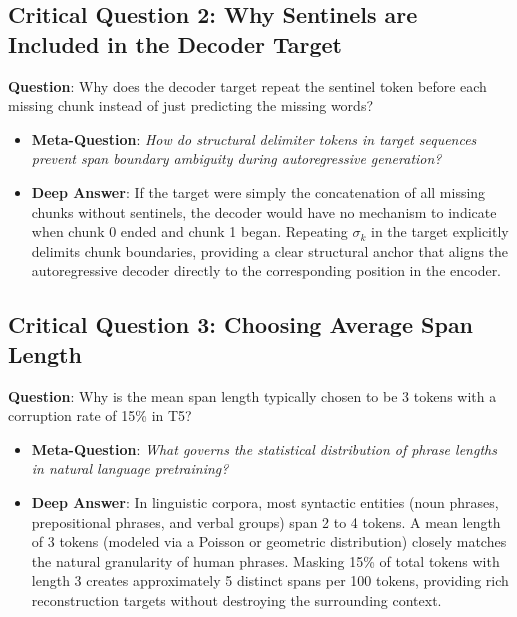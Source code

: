 \documentclass[11pt,a4paper]{article}
\theoremstyle{definition}
\begin{document}
\subsection{\textbf{Critical Question 2: Why Sentinels are Included in the Decoder Target}}
\textbf{Question}: Why does the decoder target repeat the sentinel token before each missing chunk instead of just predicting the missing words?
\begin{itemize}
    \item \textbf{Meta-Question}: \emph{How do structural delimiter tokens in target sequences prevent span boundary ambiguity during autoregressive generation?}
    \item \textbf{Deep Answer}: If the target were simply the concatenation of all missing chunks without sentinels, the decoder would have no mechanism to indicate when chunk 0 ended and chunk 1 began. Repeating $\sigma_k$ in the target explicitly delimits chunk boundaries, providing a clear structural anchor that aligns the autoregressive decoder directly to the corresponding position in the encoder.
\end{itemize}

\subsection{\textbf{Critical Question 3: Choosing Average Span Length}}
\textbf{Question}: Why is the mean span length typically chosen to be 3 tokens with a corruption rate of 15\% in T5?
\begin{itemize}
    \item \textbf{Meta-Question}: \emph{What governs the statistical distribution of phrase lengths in natural language pretraining?}
    \item \textbf{Deep Answer}: In linguistic corpora, most syntactic entities (noun phrases, prepositional phrases, and verbal groups) span 2 to 4 tokens. A mean length of 3 tokens (modeled via a Poisson or geometric distribution) closely matches the natural granularity of human phrases. Masking 15\% of total tokens with length 3 creates approximately 5 distinct spans per 100 tokens, providing rich reconstruction targets without destroying the surrounding context.
\end{itemize}
\end{document}
